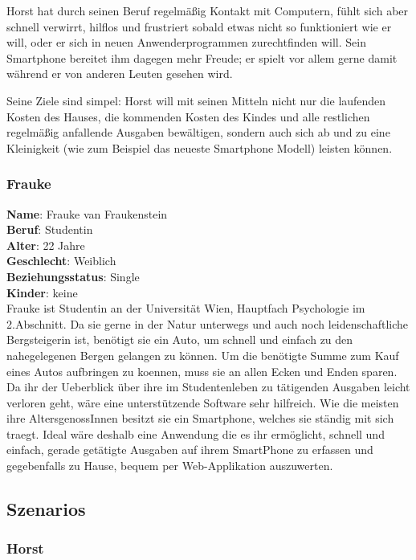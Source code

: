 Horst hat durch seinen Beruf regelm\"a\ss ig Kontakt mit Computern, f\"uhlt sich aber schnell verwirrt, hilflos und
frustriert sobald etwas nicht so funktioniert wie er will, oder er sich in neuen Anwenderprogrammen zurechtfinden will.
Sein Smartphone bereitet ihm dagegen mehr Freude; er spielt vor allem gerne damit w\"ahrend
er von anderen Leuten gesehen wird.

Seine Ziele sind simpel: Horst will mit seinen Mitteln nicht nur die laufenden Kosten des Hauses,
die kommenden Kosten des Kindes und alle restlichen regelm\"a\ss ig anfallende Ausgaben bew\"altigen,
sondern auch sich ab und zu eine Kleinigkeit (wie zum Beispiel das neueste Smartphone Modell) leisten k\"onnen.

\newpage
\subsubsection{Frauke}

\textbf{Name}: Frauke van Fraukenstein \\
\textbf{Beruf}: Studentin \\
\textbf{Alter}: 22 Jahre \\
\textbf{Geschlecht}: Weiblich \\
\textbf{Beziehungsstatus}: Single \\
\textbf{Kinder}: keine \\

Frauke ist Studentin an der Universit\"at Wien, Hauptfach Psychologie im 2.Abschnitt.
Da sie gerne in der Natur unterwegs und auch noch leidenschaftliche Bergsteigerin ist,
ben\"otigt sie ein Auto, um schnell und einfach zu den nahegelegenen Bergen gelangen
zu k\"onnen. Um die ben\"otigte Summe zum Kauf eines Autos aufbringen zu koennen, muss
sie an allen Ecken und Enden sparen. Da ihr der Ueberblick \"uber ihre im Studentenleben
zu t\"atigenden Ausgaben leicht verloren geht, w\"are eine unterst\"utzende Software sehr
hilfreich. Wie die meisten ihre AltersgenossInnen besitzt sie ein Smartphone, welches
sie st\"andig mit sich traegt. Ideal w\"are deshalb eine Anwendung die es ihr erm\"oglicht,
schnell und einfach, gerade get\"atigte Ausgaben auf ihrem SmartPhone zu erfassen und
gegebenfalls zu Hause, bequem per Web-Applikation auszuwerten.

\subsection{Szenarios}

\subsubsection{Horst}

